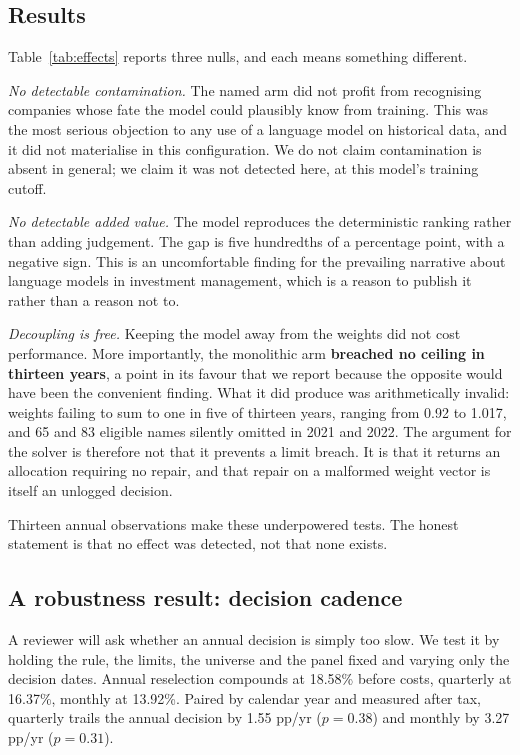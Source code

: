\documentclass[10pt,conference]{IEEEtran}
\begin{document}
\subsection{Results}

Table~\ref{tab:effects} reports three nulls, and each means something different.

\emph{No detectable contamination.} The named arm did not profit from recognising companies whose fate the model could plausibly know from training. This was the most serious objection to any use of a language model on historical data, and it did not materialise in this configuration. We do not claim contamination is absent in general; we claim it was not detected here, at this model's training cutoff.

\emph{No detectable added value.} The model reproduces the deterministic ranking rather than adding judgement. The gap is five hundredths of a percentage point, with a negative sign. This is an uncomfortable finding for the prevailing narrative about language models in investment management, which is a reason to publish it rather than a reason not to.

\emph{Decoupling is free.} Keeping the model away from the weights did not cost performance. More importantly, the monolithic arm \textbf{breached no ceiling in thirteen years}, a point in its favour that we report because the opposite would have been the convenient finding. What it did produce was arithmetically invalid: weights failing to sum to one in five of thirteen years, ranging from 0.92 to 1.017, and 65 and 83 eligible names silently omitted in 2021 and 2022. The argument for the solver is therefore not that it prevents a limit breach. It is that it returns an allocation requiring no repair, and that repair on a malformed weight vector is itself an unlogged decision.

Thirteen annual observations make these underpowered tests. The honest statement is that no effect was detected, not that none exists.

\subsection{A robustness result: decision cadence}

A reviewer will ask whether an annual decision is simply too slow. We test it by holding the rule, the limits, the universe and the panel fixed and varying only the decision dates. Annual reselection compounds at 18.58\% before costs, quarterly at 16.37\%, monthly at 13.92\%. Paired by calendar year and measured after tax, quarterly trails the annual decision by 1.55 pp/yr ($p=0.38$) and monthly by 3.27 pp/yr ($p=0.31$).
\end{document}
